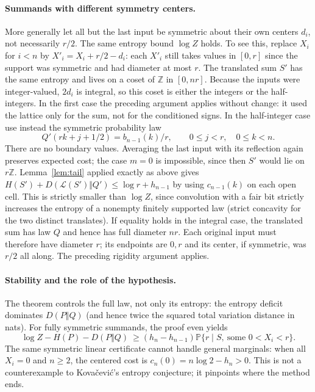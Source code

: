 \documentclass[11pt]{article}
\newcommand{\Prb}{\mathbb P}
\begin{document}
\paragraph{Summands with different symmetry centers.}
More generally let all but the last input be symmetric about their
own centers $d_i$, not necessarily $r/2$. The same entropy bound $\log Z$
holds. To see this, replace $X_i$ for $i<n$ by $X'_i=X_i+r/2-d_i$:
each $X'_i$ still takes values in $[0,r]$ since the support was
symmetric and had diameter at most $r$. The translated sum $S'$ has the
same entropy and lives on a coset of $\mathbb Z$ in $[0,nr]$.
Because the inputs were integer-valued, $2d_i$ is integral, so this
coset is either the integers or the half-integers. In the first case
the preceding argument applies without change: it used the lattice
only for the sum, not for the conditioned signs. In the half-integer
case use instead the symmetric probability law
\[
 Q'(rk+j+1/2)=b_{n-1}(k)/r,\qquad 0\le j<r,\quad 0\le k<n.
\]
There are no boundary values. Averaging the last input with its reflection
again preserves expected cost; the case $m=0$ is impossible, since then
$S'$ would lie on $r\mathbb Z$. Lemma~\ref{lem:tail} applied exactly
as above gives $H(S')+D(\mathcal L(S')\Vert Q')\le\log r+h_{n-1}$
by using $c_{n-1}(k)$ on each open cell. This is strictly smaller than
$\log Z$, since convolution with a fair bit strictly increases the entropy
of a nonempty finitely supported law (strict concavity for the two distinct
translates).
If equality holds in the integral case, the translated sum has law $Q$
and hence has full diameter $nr$. Each original input must therefore have
diameter $r$; its endpoints are $0,r$ and its center, if symmetric, was
$r/2$ all along. The preceding rigidity argument applies.
\paragraph{Stability and the role of the hypothesis.}
The theorem controls the full law, not only its entropy: the entropy
deficit dominates $D(P\Vert Q)$ (and hence twice the squared total
variation distance in nats). For fully symmetric summands, the proof
even yields
\[
 \log Z-H(P)-D(P\Vert Q)
 \ \ge (h_n-h_{n-1})\Prb\{r\mid S,\ \text{some }0<X_i<r\}.
\]
The same symmetric linear certificate cannot handle general marginals:
when all $X_i=0$ and $n\ge2$, the centered cost is
$c_n(0)=n\log2-h_n>0$. This is not a counterexample to Kova\v{c}evi\'c's
entropy conjecture; it pinpoints where the method ends.
\end{document}
